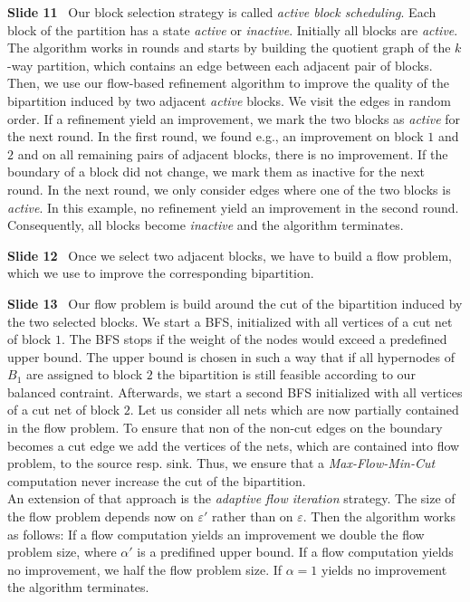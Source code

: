 \documentclass[11pt]{llncs}
\newcommand{\fakepar}[1]{\medskip\par\textbf{#1}\ }
\begin{document}
\fakepar{Slide 11} Our block selection strategy is called \emph{active block scheduling}.
Each block of the partition has a state \emph{active} or \emph{inactive}. Initially all blocks
are \emph{active}. The algorithm works in rounds and starts by building the quotient graph
of the $k$-way partition, which contains an edge between each adjacent pair of blocks.
Then, we use our flow-based refinement algorithm to improve
the quality of the bipartition induced by two adjacent \emph{active} blocks. We visit the
edges in random order. If a refinement yield an improvement, we mark the two blocks as \emph{active}
for the next round. In the first round, we found e.g., an improvement on block $1$ and $2$ and on
all remaining pairs of adjacent blocks, there is no improvement. If the boundary of a block did not 
change, we mark them as inactive for the next round. In the next round, we only consider edges
where one of the two blocks is \emph{active}. In this example, no refinement yield an improvement
in the second round. Consequently, all blocks become \emph{inactive} and the algorithm
terminates.

\fakepar{Slide 12} Once we select two adjacent blocks, we have to build a flow problem, which
we use to improve the corresponding bipartition.

\fakepar{Slide 13} Our flow problem is build around the cut of the bipartition induced by
the two selected blocks. We start a BFS, initialized with all vertices of a cut net of block $1$.
The BFS stops if the weight of the nodes would exceed a predefined upper bound. The upper bound
is chosen in such a way that if all hypernodes of $B_1$ are assigned to block $2$ the bipartition is
still feasible according to our balanced contraint. Afterwards, we start a second BFS initialized
with all vertices of a cut net of block $2$. Let us consider all nets which are now partially
contained in the flow problem. To ensure that non of the non-cut edges on the boundary becomes
a cut edge we add the vertices of the nets, which are contained into flow problem, to the source
resp. sink. Thus, we ensure that a \emph{Max-Flow-Min-Cut} computation never increase the
cut of the bipartition. \\
An extension of that approach is the \emph{adaptive flow iteration} strategy. The size
of the flow problem depends now on $\varepsilon'$ rather than on $\varepsilon$. Then the
algorithm works as follows: If a flow computation yields an improvement we double the flow problem
size, where $\alpha'$ is a predifined upper bound. If a flow computation yields no improvement, we half
the flow problem size. If $\alpha = 1$ yields no improvement the algorithm terminates.
\end{document}
